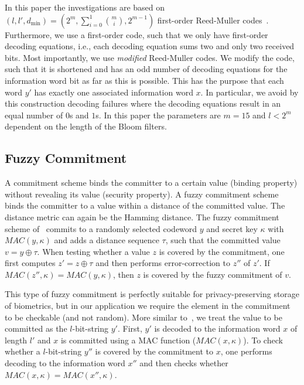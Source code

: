\documentclass{llncs}
\begin{document}
In this paper the investigations are based on $(l,l',d_{\text{min}})=(2^m,\sum\limits_{i=0}^1{m\choose i},2^{m-1})$ first-order Reed-Muller codes~\cite{Mul54,Ree54}.
Furthermore, we use a first-order code, such that we only have first-order decoding equations, i.e., each decoding equation sums two and only two received bits.
Most importantly, we use {\em modified} Reed-Muller codes.
We modify the code, such that it is shortened and has an odd number of decoding equations for the information word bit as far as this is possible.
This has the purpose that each word $y'$ has exactly one associated information word $x$.
In particular, we avoid by this construction decoding failures where the decoding equations result in an equal number of $0$s and $1$s.
In this paper the parameters are $m = 15$ and $l < 2^m$ dependent on the length of the Bloom filters.

\subsection{Fuzzy Commitment}
\label{sec:fc}

A commitment scheme binds the committer to a certain value (binding property) without revealing its value (security property).
A fuzzy commitment scheme binds the committer to a value within a distance of the committed value.
The distance metric can again be the Hamming distance.
The fuzzy commitment scheme of~\cite{JueWat99} commits to a randomly selected codeword $y$ and secret key $\kappa$ with $MAC(y, \kappa)$ and adds a distance sequence $\tau$, such that the committed value $v = y \oplus \tau$.
When testing whether a value $z$ is covered by the commitment, one first computes $z' = z \oplus \tau$ and then performs error-correction to $z''$ of $z'$.
If $MAC(z'', \kappa) = MAC(y, \kappa)$, then $z$ is covered by the fuzzy commitment of $v$.

This type of fuzzy commitment is perfectly suitable for privacy-preserving storage of biometrics, but in our application we require the element in the commitment to be checkable (and not random).
More similar to~\cite{DavFra98}, we treat the value to be committed as the $l$-bit-string $y'$.
First, $y'$ is decoded to the information word $x$ of length $l'$ and $x$ is committed using a MAC function ($MAC(x, \kappa)$).
To check whether a $l$-bit-string $y''$ is covered by the commitment to $x$, one performs decoding to the information word $x''$ and then checks whether $MAC(x, \kappa) = MAC(x'', \kappa)$.
\end{document}
